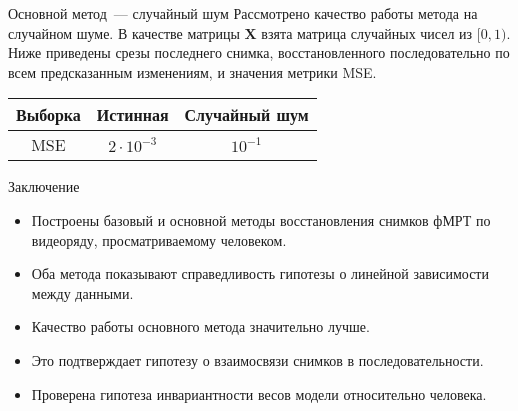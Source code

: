 \documentclass{beamer}
\begin{document}
\begin{frame}{Основной метод~--- случайный шум}
    Рассмотрено качество работы метода на случайном шуме. В качестве матрицы $\mathbf{X}$
	взята матрица случайных чисел из $[0, 1)$. Ниже приведены срезы последнего снимка, восстановленного
    последовательно по всем предсказанным изменениям, и значения метрики MSE.
	\begin{figure}[h!]
		\centering
		\hfill
		\hfill
		\label{fig:8}
	\end{figure}
    \begin{table}[h!]
		\centering
		\begin{tabular}{|c|c|c|}
			\hline
			Выборка	&	Истинная	&	Случайный шум \\ \hline \hline
			MSE		& 	$2 \cdot 10^{-3}$	 &		$10^{-1}$ \\ \hline
		\end{tabular}
		\label{table:2}
	\end{table}    
\end{frame}
\begin{frame}{Заключение}
    \begin{itemize}
        \item Построены базовый и основной методы восстановления снимков фМРТ по видеоряду, просматриваемому
        человеком.
        \item Оба метода показывают справедливость гипотезы о линейной зависимости между данными.
        \item Качество работы основного метода значительно лучше.
        \item Это подтверждает гипотезу о взаимосвязи снимков в последовательности.
        \item Проверена гипотеза инвариантности весов модели относительно человека.
    \end{itemize}
\end{frame}
\end{document}
